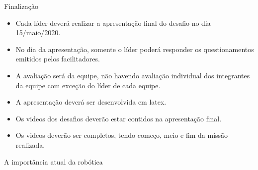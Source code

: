 \begin{frame}[t]{Finalização}
    \begin{itemize}
        \item Cada líder deverá realizar a apresentação final do desafio no dia 15/maio/2020.
        \item No dia da apresentação, somente o líder poderá responder os questionamentos emitidos pelos facilitadores.
        \item A avaliação será da equipe, não havendo avaliação individual dos integrantes da equipe com exceção do líder de cada equipe.
        \item A apresentação deverá ser desenvolvida em latex.
        \item Os videos dos desafios deverão estar contidos na apresentação final.
        \item Os videos deverão ser completos, tendo começo, meio e fim da missão realizada.
    \end{itemize}
\end{frame}
\begin{frame}[c]{A importância atual da robótica}
    \begin{center}
    
    \end{center}



 \end{frame}
